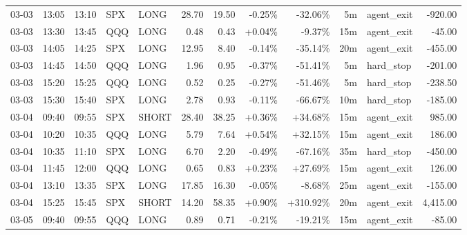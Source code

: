 \documentclass[11pt,a4paper]{article}
\begin{document}
\begin{center}
\begin{longtable}{>{\color{txtmain}}l l l l l r r r r r >{\color{txtmain}}l r}
03-03 & 13:05 & 13:10 & SPX & LONG & 28.70 & 19.50 & \textcolor{lossred}{-0.25\%} & \textcolor{lossred}{-32.06\%} & 5m & agent\_exit & \textcolor{lossred}{-920.00} \\
03-03 & 13:30 & 13:45 & QQQ & LONG & 0.48 & 0.43 & \textcolor{wingreen}{+0.04\%} & \textcolor{lossred}{-9.37\%} & 15m & agent\_exit & \textcolor{lossred}{-45.00} \\
03-03 & 14:05 & 14:25 & SPX & LONG & 12.95 & 8.40 & \textcolor{lossred}{-0.14\%} & \textcolor{lossred}{-35.14\%} & 20m & agent\_exit & \textcolor{lossred}{-455.00} \\
03-03 & 14:45 & 14:50 & QQQ & LONG & 1.96 & 0.95 & \textcolor{lossred}{-0.37\%} & \textcolor{lossred}{-51.41\%} & 5m & hard\_stop & \textcolor{lossred}{-201.00} \\
03-03 & 15:20 & 15:25 & QQQ & LONG & 0.52 & 0.25 & \textcolor{lossred}{-0.27\%} & \textcolor{lossred}{-51.46\%} & 5m & hard\_stop & \textcolor{lossred}{-238.50} \\
03-03 & 15:30 & 15:40 & SPX & LONG & 2.78 & 0.93 & \textcolor{lossred}{-0.11\%} & \textcolor{lossred}{-66.67\%} & 10m & hard\_stop & \textcolor{lossred}{-185.00} \\
03-04 & 09:40 & 09:55 & SPX & SHORT & 28.40 & 38.25 & \textcolor{wingreen}{+0.36\%} & \textcolor{wingreen}{+34.68\%} & 15m & agent\_exit & \textcolor{wingreen}{985.00} \\
03-04 & 10:20 & 10:35 & QQQ & LONG & 5.79 & 7.64 & \textcolor{wingreen}{+0.54\%} & \textcolor{wingreen}{+32.15\%} & 15m & agent\_exit & \textcolor{wingreen}{186.00} \\
03-04 & 10:35 & 11:10 & SPX & LONG & 6.70 & 2.20 & \textcolor{lossred}{-0.49\%} & \textcolor{lossred}{-67.16\%} & 35m & hard\_stop & \textcolor{lossred}{-450.00} \\
03-04 & 11:45 & 12:00 & QQQ & LONG & 0.65 & 0.83 & \textcolor{wingreen}{+0.23\%} & \textcolor{wingreen}{+27.69\%} & 15m & agent\_exit & \textcolor{wingreen}{126.00} \\
03-04 & 13:10 & 13:35 & SPX & LONG & 17.85 & 16.30 & \textcolor{lossred}{-0.05\%} & \textcolor{lossred}{-8.68\%} & 25m & agent\_exit & \textcolor{lossred}{-155.00} \\
03-04 & 15:25 & 15:45 & SPX & SHORT & 14.20 & 58.35 & \textcolor{wingreen}{+0.90\%} & \textcolor{wingreen}{+310.92\%} & 20m & agent\_exit & \textcolor{wingreen}{4,415.00} \\
03-05 & 09:40 & 09:55 & QQQ & LONG & 0.89 & 0.71 & \textcolor{lossred}{-0.21\%} & \textcolor{lossred}{-19.21\%} & 15m & agent\_exit & \textcolor{lossred}{-85.00} \\

\end{longtable}
\end{center}
\end{document}
